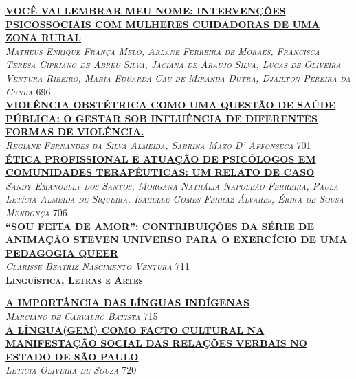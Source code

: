 \noindent \textsc{\hyperlink{trabalhos/251794.pdf.1}{\textbf{VOCÊ VAI LEMBRAR MEU NOME: INTERVENÇÕES PSICOSSOCIAIS COM MULHERES CUIDADORAS DE UMA ZONA RURAL}}}\\ 
\noindent \textsc{\textit{Matheus Enrique França Melo, Arlane Ferreira de Moraes, Francisca Teresa Cipriano de Abreu Silva, Jaciana de Araújo Silva, Lucas de Oliveira Ventura Ribeiro, Maria Eduarda Caú de Miranda Dutra, Djailton Pereira da Cunha}} \hfill 696\\ 

\noindent \textsc{\hyperlink{trabalhos/249778.pdf.1}{\textbf{VIOLÊNCIA OBSTÉTRICA COMO UMA QUESTÃO DE SAÚDE PÚBLICA:  O GESTAR SOB INFLUÊNCIA DE DIFERENTES FORMAS DE VIOLÊNCIA. }}}\\ 
\noindent \textsc{\textit{Regiane Fernandes da Silva Almeida, Sabrina Mazo D’ Affonseca}} \hfill 701\\ 

\noindent \textsc{\hyperlink{trabalhos/246991.pdf.1}{\textbf{ÉTICA PROFISSIONAL E ATUAÇÃO DE PSICÓLOGOS EM COMUNIDADES TERAPÊUTICAS: UM RELATO DE CASO}}}\\ 
\noindent \textsc{\textit{Sandy Emanoelly dos Santos, Morgana Nathália Napoleão Ferreira, Paula Letícia Almeida de Siqueira, Isabelle Gomes Ferraz Álvares, Érika de Sousa Mendonça}} \hfill 706\\ 

\noindent \textsc{\hyperlink{trabalhos/251586.pdf.1}{\textbf{“SOU FEITA DE AMOR”: CONTRIBUIÇÕES DA SÉRIE DE ANIMAÇÃO STEVEN UNIVERSO PARA O EXERCÍCIO DE UMA PEDAGOGIA QUEER}}}\\ 
\noindent \textsc{\textit{Clarisse Beatriz Nascimento Ventura}} \hfill 711\\ 


\vspace*{2cm} 
\noindent \textsc{\textbf{\LARGE Linguística, Letras e Artes}}\\ 
\vspace*{1cm} 

\noindent \textsc{\hyperlink{trabalhos/250295.pdf.1}{\textbf{A IMPORTÂNCIA DAS LÍNGUAS INDÍGENAS}}}\\ 
\noindent \textsc{\textit{Marciano de Carvalho Batista}} \hfill 715\\ 

\noindent \textsc{\hyperlink{trabalhos/251755.pdf.1}{\textbf{A LÍNGUA(GEM) COMO FACTO CULTURAL NA MANIFESTAÇÃO SOCIAL DAS RELAÇÕES VERBAIS NO ESTADO DE SÃO PAULO}}}\\ 
\noindent \textsc{\textit{Leticia Oliveira de Souza}} \hfill 720\\ 

